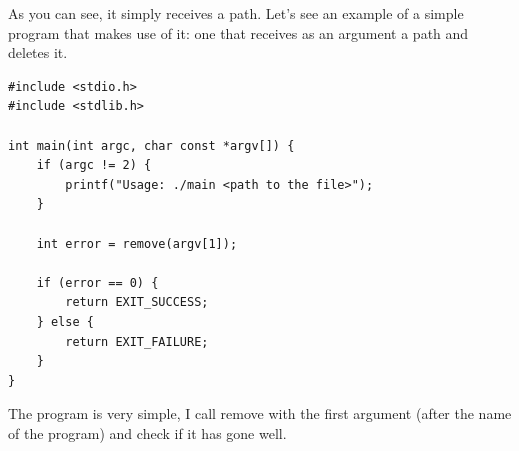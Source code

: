 \documentclass[a4paper]{article}
\begin{document}
As you can see, it simply receives a path. Let's see an example of a simple
program that makes use of it: one that receives as an argument a path and
deletes it.

\noindent
\begin{minipage}[H]{\linewidth}
\mbox{}
\begin{lstlisting}[style=C,
caption={Example of a program that uses \texttt{remove}},
label={lst:exampleRemove}]
#include <stdio.h>
#include <stdlib.h>

int main(int argc, char const *argv[]) {
    if (argc != 2) {
        printf("Usage: ./main <path to the file>");
    }

    int error = remove(argv[1]);

    if (error == 0) {
        return EXIT_SUCCESS;
    } else {
        return EXIT_FAILURE;
    }
}
\end{lstlisting}
\end{minipage}

The program is very simple, I call remove with the first
argument (after the name of the program) and check if it has gone well.
\end{document}
